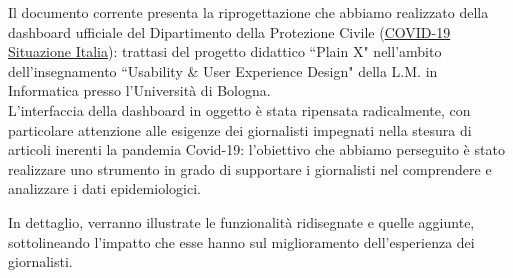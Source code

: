 \documentclass[../../main.tex]{subfiles}
\begin{document}
\begin{executive}

    Il documento corrente presenta la riprogettazione che abbiamo realizzato della dashboard ufficiale del Dipartimento della Protezione Civile (\href{https://opendatadpc.maps.arcgis.com/apps/opsdashboard/index.html#/b0c68bce2cce478eaac82fe38d4138b1}{COVID-19 Situazione Italia}): trattasi del progetto didattico ``Plain X" nell'ambito dell'insegnamento ``Usability \& User Experience Design" della L.M. in Informatica presso l'Università di Bologna.\\
    L'interfaccia della dashboard in oggetto è stata ripensata radicalmente, con particolare attenzione alle esigenze dei giornalisti impegnati nella stesura di articoli inerenti la pandemia Covid-19: l'obiettivo che abbiamo perseguito è stato realizzare uno strumento in grado di supportare i giornalisti nel comprendere e analizzare i dati epidemiologici.

    In dettaglio, verranno illustrate le funzionalità ridisegnate e quelle aggiunte, sottolineando l'impatto che esse hanno sul miglioramento dell'esperienza dei giornalisti.

\end{executive}
\end{document}

